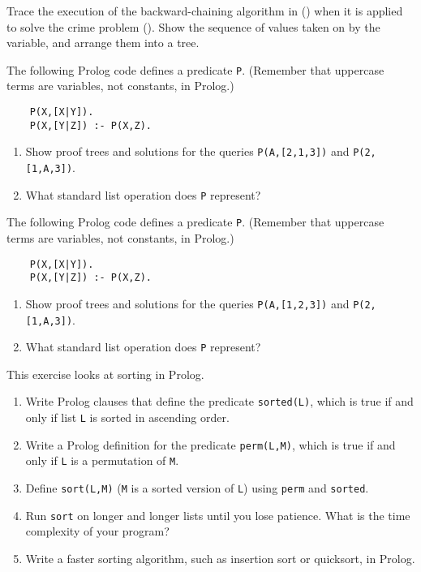 \begin{exercise}%
Trace the execution of the backward-chaining algorithm in
 () when it is applied to solve the crime
problem (). Show the sequence of values taken on by  the 
variable, and arrange them into a tree.
\end{exercise} 

\begin{uexercise}
The following Prolog code defines a predicate {\tt P}.
(Remember that uppercase terms are variables, not constants, in Prolog.)
\begin{verbatim}
    P(X,[X|Y]).
    P(X,[Y|Z]) :- P(X,Z).
\end{verbatim}
\begin{enumerate}
\item Show proof trees and solutions for the queries
{\tt P(A,[2,1,3])} and {\tt P(2,[1,A,3])}.
\item What standard list operation does {\tt P} represent?
\end{enumerate}
\end{uexercise} 

\begin{iexercise}
The following Prolog code defines a predicate {\tt P}.
(Remember that uppercase terms are variables, not constants, in Prolog.)
\begin{verbatim}
    P(X,[X|Y]).
    P(X,[Y|Z]) :- P(X,Z).
\end{verbatim}
\begin{enumerate}
\item Show proof trees and solutions for the queries
{\tt P(A,[1,2,3])} and {\tt P(2,[1,A,3])}.
\item What standard list operation does {\tt P} represent?
\end{enumerate}
\end{iexercise} 

\begin{exercise}
\prgex This exercise looks at sorting in Prolog.
\begin{enumerate}
\item
Write Prolog clauses that define the predicate {\tt sorted(L)}, which
is true if and only if list {\tt L} is sorted in ascending order.
\item
Write a Prolog definition for the predicate {\tt perm(L,M)}, which is
true if and only if {\tt L} is a permutation of {\tt M}.
\item Define {\tt sort(L,M)} ({\tt M} is a sorted version of {\tt L})
using {\tt perm} and {\tt sorted}.
\item Run {\tt sort} on longer and longer lists until you lose
patience.
What is the time complexity of your program?
\item Write a faster sorting algorithm, such as insertion sort or
quicksort, in Prolog.
\end{enumerate}
\end{exercise} 

